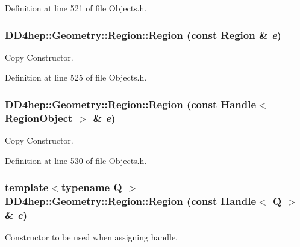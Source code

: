 Definition at line 521 of file Objects.h.\hypertarget{class_d_d4hep_1_1_geometry_1_1_region_a81c2f0b5d7cd042c22af48acd27bf95c}{
\subsubsection[{Region}]{\setlength{\rightskip}{0pt plus 5cm}DD4hep::Geometry::Region::Region (const {\bf Region} \& {\em e})}}
\label{class_d_d4hep_1_1_geometry_1_1_region_a81c2f0b5d7cd042c22af48acd27bf95c}


Copy Constructor. 

Definition at line 525 of file Objects.h.\hypertarget{class_d_d4hep_1_1_geometry_1_1_region_a965bf209a05655ee147c4adcdddfe20f}{
\subsubsection[{Region}]{\setlength{\rightskip}{0pt plus 5cm}DD4hep::Geometry::Region::Region (const {\bf Handle}$<$ {\bf RegionObject} $>$ \& {\em e})}}
\label{class_d_d4hep_1_1_geometry_1_1_region_a965bf209a05655ee147c4adcdddfe20f}


Copy Constructor. 

Definition at line 530 of file Objects.h.\hypertarget{class_d_d4hep_1_1_geometry_1_1_region_a7199d3d0e37bde7202cc311958028d1b}{
\subsubsection[{Region}]{\setlength{\rightskip}{0pt plus 5cm}template$<$typename Q $>$ DD4hep::Geometry::Region::Region (const {\bf Handle}$<$ Q $>$ \& {\em e})}}
\label{class_d_d4hep_1_1_geometry_1_1_region_a7199d3d0e37bde7202cc311958028d1b}


Constructor to be used when assigning handle. 

